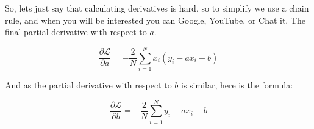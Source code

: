 \documentclass{article}
\begin{document}
    So, lets just say that calculating derivatives is hard, so to simplify we use a chain rule, and when you will be interested you can Google, YouTube, or Chat it.
    The final partial derivative with respect to $a$.

    \begin{equation}
        \frac{\partial\mathcal L}{\partial a} = -\frac{2}{N}\sum_{i=1}^{N}x_i \left(y_i-ax_i-b\right)
    \end{equation}

    And as the partial derivative with respect to $b$ is similar, here is the formula:

    \begin{equation}
        \frac{\partial\mathcal L}{\partial b} = -\frac{2}{N}\sum_{i=1}^{N} y_i - ax_i-b
    \end{equation}
\end{document}
